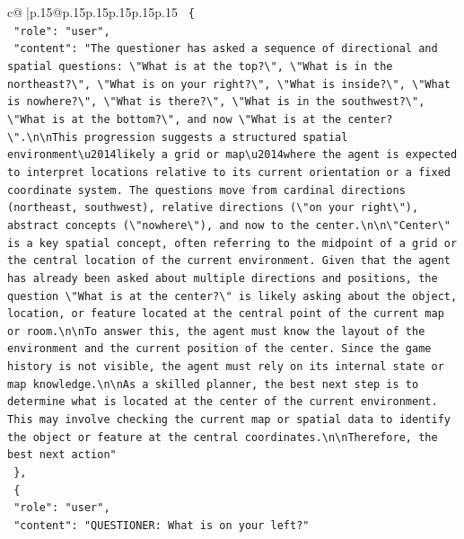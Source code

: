 \documentclass{article}
\begin{document}
{\begin{supertabular}{c@{$\;$}|p{.15\linewidth}@{}p{.15\linewidth}p{.15\linewidth}p{.15\linewidth}p{.15\linewidth}p{.15\linewidth}}
{{{\texttt{  \{} \\
\texttt{    "role": "user",} \\
\texttt{    "content": "The questioner has asked a sequence of directional and spatial questions: \textbackslash{}"What is at the top?\textbackslash{}", \textbackslash{}"What is in the northeast?\textbackslash{}", \textbackslash{}"What is on your right?\textbackslash{}", \textbackslash{}"What is inside?\textbackslash{}", \textbackslash{}"What is nowhere?\textbackslash{}", \textbackslash{}"What is there?\textbackslash{}", \textbackslash{}"What is in the southwest?\textbackslash{}", \textbackslash{}"What is at the bottom?\textbackslash{}", and now \textbackslash{}"What is at the center?\textbackslash{}".\textbackslash{}n\textbackslash{}nThis progression suggests a structured spatial environment\textbackslash{}u2014likely a grid or map\textbackslash{}u2014where the agent is expected to interpret locations relative to its current orientation or a fixed coordinate system. The questions move from cardinal directions (northeast, southwest), relative directions (\textbackslash{}"on your right\textbackslash{}"), abstract concepts (\textbackslash{}"nowhere\textbackslash{}"), and now to the center.\textbackslash{}n\textbackslash{}n\textbackslash{}"Center\textbackslash{}" is a key spatial concept, often referring to the midpoint of a grid or the central location of the current environment. Given that the agent has already been asked about multiple directions and positions, the question \textbackslash{}"What is at the center?\textbackslash{}" is likely asking about the object, location, or feature located at the central point of the current map or room.\textbackslash{}n\textbackslash{}nTo answer this, the agent must know the layout of the environment and the current position of the center. Since the game history is not visible, the agent must rely on its internal state or map knowledge.\textbackslash{}n\textbackslash{}nAs a skilled planner, the best next step is to determine what is located at the center of the current environment. This may involve checking the current map or spatial data to identify the object or feature at the central coordinates.\textbackslash{}n\textbackslash{}nTherefore, the best next action"} \\
\texttt{  \},} \\
\texttt{  \{} \\
\texttt{    "role": "user",} \\
\texttt{    "content": "QUESTIONER: What is on your left?"} \\
}}}
\end{supertabular}}
\end{document}
